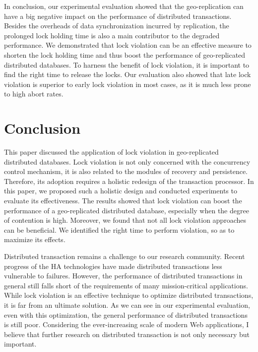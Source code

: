 \documentclass[conference]{IEEEtran}
\begin{document}
In conclusion, our experimental evaluation showed that the geo-replication can have a big negative impact on the performance of distributed transactions.
Besides the overheads of data synchronization incurred by replication, the prolonged lock holding time is also a main contributor to the degraded performance.
We demonstrated that lock violation can be an effective measure to shorten the lock holding time and thus boost the performance of geo-replicated distributed databases.
To harness the benefit of lock violation, it is important to find the right time to release the locks.
Our evaluation also showed that late lock violation is superior to early lock violation in most cases, as it is much less prone to high abort rates.


\section{Conclusion}
\label{sec:conclusion}

This paper discussed the application of lock violation in geo-replicated distributed databases.
Lock violation is not only concerned with the concurrency control mechanism, it is also related to the modules of recovery and persistence.
Therefore, its adoption requires a holistic redesign of the transaction processor. 
In this paper, we proposed such a holistic design and conducted experiments to evaluate its effectiveness.
The results showed that lock violation can boost the performance of a geo-replicated distributed database, especially when the degree of contention is high.
Moreover, we found that not all lock violation approaches can be beneficial. We identified the right time to perform violation, so as to maximize its effects. 

Distributed transaction remains a challenge to our research community. Recent progress of the HA technologies have made distributed transactions less vulnerable to failures.
However, the performance of distributed transactions in general still falls short of the requirements of many mission-critical applications.
While lock violation is an effective technique to optimize distributed transactions, it is far from an ultimate solution.
As we can see in our experimental evaluation, even with this optimization, the general performance of distributed transactions is still poor.
Considering the ever-increasing scale of modern Web applications, I believe that further research on distributed transaction is not only necessary but important.



\end{document}
